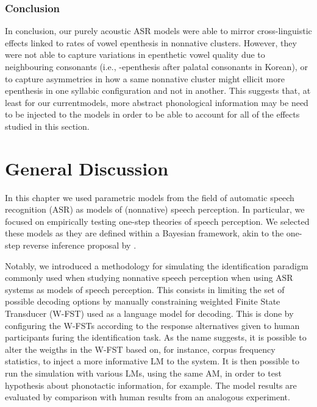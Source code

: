 {\subsubsection{Conclusion}
In conclusion, our purely acoustic ASR models were able to mirror cross-linguistic effects linked to rates of vowel epenthesis in nonnative clusters. However, they were not able to capture variations in epenthetic vowel quality due to neighbouring consonants (i.e., -epenthesis after palatal consonants in Korean), or to capture asymmetries in how a same nonnative cluster might ellicit more epenthesis in one syllabic configuration and not in another. This suggests that, at least for our currentmodels, more abstract phonological information may be need to be injected to the models in order to be able to account for all of the effects studied in this section.  


\newpage
\section{General Discussion}
In this chapter we used parametric models from the field of automatic speech recognition (ASR) as models of (nonnative) speech perception. In particular, we focused on empirically testing one-step theories of speech perception. We selected these models as they are defined within a Bayesian framework, akin to the one-step reverse inference proposal by \cite{wilson2013}.

Notably, we introduced a methodology for simulating the identification paradigm commonly used when studying nonnative speech perception when using ASR systems as models of speech perception. This consists in limiting the set of possible decoding options by manually constraining weighted Finite State Transducer (W-FST) used as a language model for decoding. This is done by configuring the W-FSTs according to the response alternatives given to human participants furing the identification task. As the name suggests, it is possible to alter the weigths in the W-FST based on, for instance, corpus frequency statistics, to inject a more informative LM to the system. It is then possible to run the simulation with various LMs, using the same AM, in order to test hypothesis about phonotactic information, for example.
The model results are evaluated by comparison with human results from an analogous experiment.

}
